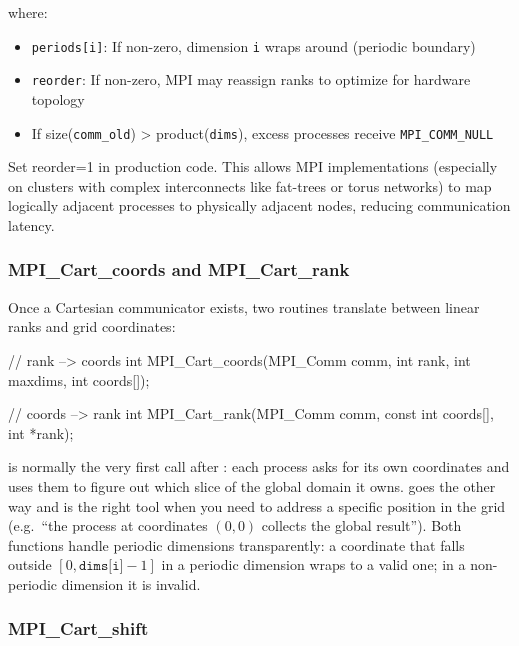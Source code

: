 where:
\begin{itemize}
    \item \texttt{periods[i]}: If non-zero, dimension \texttt{i} wraps around (periodic boundary)
    \item \texttt{reorder}: If non-zero, MPI may reassign ranks to optimize for hardware topology
    \item If size(\texttt{comm\_old}) > product(\texttt{dims}), excess processes receive \texttt{MPI\_COMM\_NULL}
\end{itemize}

\begin{tipsblock}
    Set reorder=1 in production code. This allows MPI implementations (especially on clusters with complex interconnects like fat-trees or torus networks) to map logically adjacent processes to physically adjacent nodes, reducing communication latency.
\end{tipsblock}

\subsubsection{MPI\_Cart\_coords and MPI\_Cart\_rank}

Once a Cartesian communicator exists, two routines translate between linear ranks and grid coordinates:

\begin{codeblock}[language=C]
// rank --> coords
int MPI_Cart_coords(MPI_Comm comm, int rank, int maxdims, int coords[]);

// coords --> rank
int MPI_Cart_rank(MPI_Comm comm, const int coords[], int *rank);
\end{codeblock}

 is normally the very first call after : each process asks for its own coordinates and uses them to figure out which slice of the global domain it owns.  goes the other way and is the right tool when you need to address a specific position in the grid (e.g.\ ``the process at coordinates $(0, 0)$ collects the global result''). Both functions handle periodic dimensions transparently: a coordinate that falls outside $[0, \texttt{dims[i]}-1]$ in a periodic dimension wraps to a valid one; in a non-periodic dimension it is invalid.

\subsubsection{MPI\_Cart\_shift}

